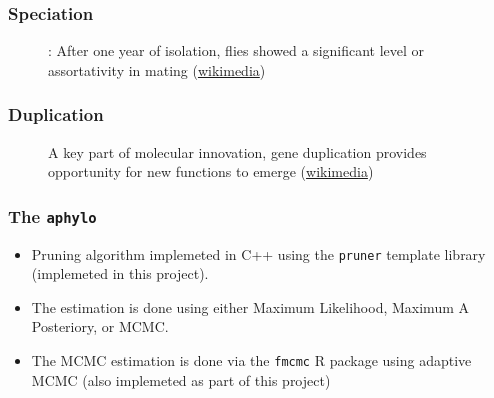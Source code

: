 \documentclass[aspectratio=169, 9pt, handout]{beamer}\usepackage[]{graphicx}\usepackage[]{color}
\newcommand{\aphylopkg}[0]{\texttt{aphylo}}
\begin{document}
\begin{frame}[label = duplicationvsspeciation]
\frametitle{Speciation}
\begin{figure}
\centering
\def\svgwidth{.8\linewidth}
\tiny

\caption{: After one year of isolation, flies showed a significant level or assortativity in mating (\href{https://commons.wikimedia.org/wiki/File:Drosophila_speciation_experiment.svg}{wikimedia})}
\end{figure}

\vfill\hfill \hyperlink{aphylographicalview}{}

\end{frame}

\begin{frame}
\frametitle{Duplication}
\begin{figure}
\centering
\def\svgwidth{.6\linewidth}
\tiny

\caption{A key part of molecular innovation, gene duplication provides opportunity for new functions to emerge (\href{https://en.wikipedia.org/wiki/File:Evolution_fate_duplicate_genes_-_vector.svg}{wikimedia})}
\end{figure}

\vfill\hfill \hyperlink{aphylographicalviewcont}{}

\end{frame}

\begin{frame}[label=aphylopkg]
\frametitle{The \aphylopkg{}}

\begin{itemize}
\item Pruning algorithm implemeted in C++ using the \texttt{pruner} template library (implemeted in this project).
\item The estimation is done using either Maximum Likelihood, Maximum A Posteriory, or MCMC.
\item The MCMC estimation is done via the \texttt{fmcmc} R package using adaptive MCMC
(also implemeted as part of this project)
\end{itemize}

\vfill\hfill \hyperlink{aphylographicalviewcont}{}
\end{frame}
\end{document}
